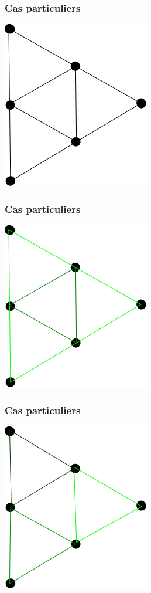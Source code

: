 \documentclass{beamer}
\begin{document}
\begin{frame}
	\frametitle{Cas particuliers}
    \begin{center}
    \includegraphics[height=0.7\textheight]{sierpinski1}
    \end{center}
\end{frame}
\begin{frame}
	\frametitle{Cas particuliers}
    \begin{center}
    \includegraphics[height=0.7\textheight]{sierpinski2}
    \end{center}
\end{frame}
\begin{frame}
	\frametitle{Cas particuliers}
    \begin{center}
    \includegraphics[height=0.7\textheight]{sierpinski3}
    \end{center}
\end{frame}
\end{document}
